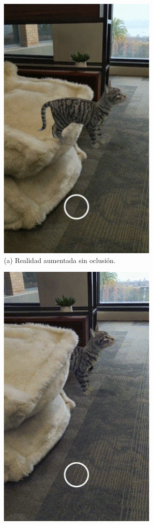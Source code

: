 \begin{figure}[H]
\centering
    \hspace{-4mm}
    \begin{minipage}{0.5\textwidth}
        \centering
        \includegraphics[scale=0.4]{Images/Estado del arte/nooclussion.jpg}\\
        (a) Realidad aumentada sin oclusión.
    \end{minipage}
    \begin{minipage}{0.5\textwidth}
        \centering
        \includegraphics[scale=0.4]{Images/Estado del arte/sioclussion.jpg}\\

\end{minipage}
\end{figure}
